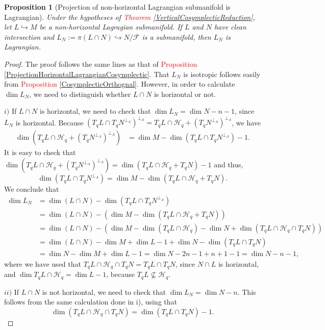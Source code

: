 \documentclass[12pt]{article}
\newtheorem{prop}{Proposition}[section]
\renewcommand{\dim}{\operatorname{dim}}
\begin{document}
\begin{prop}[Projection of non-horizontal Lagrangian submanifold is Lagrangian] \label{ProjectionNonHorizontalLagrangian}  Under the hypotheses of \textcolor{red}{Theorem \ref{VerticalCosymplecticReduction}}, let $L \hookrightarrow M$ be a non-horizontal Lagragian submanifold. If $L$ and $N$ have clean intersection and $L_N:= \pi(L \cap N) \hookrightarrow N/\mathcal{F}$ is a submanifold, then $L_N$ is Lagrangian.
\end{prop}
\begin{proof} The proof follows the same lines as that of \textcolor{red}{Proposition \ref{ProjectionHorizontalLagrangianCosymplectic}}. That $L_N$ is isotropic follows easily from \textcolor{red}{Proposition \ref{CosymplecticOrthognal}}. However, in order to calculate $\dim L_N$, we need to distinguish whether $L \cap N$ is horizontal or not. 
\item[$i)$] If $L\cap N$ is horizontal, we need to check that $\dim L_N = \dim N - n - 1$, since $L_N$ is horizontal. Because $(T_qL \cap T_qN^{\perp_\Lambda})^{\perp_\Lambda} = T_qL \cap \mathcal{H}_q + (T_qN^{\perp_\Lambda})^{\perp_\Lambda}$, we have
\begin{align*}
 \dim(T_qL\cap \mathcal{H}_q + (T_qN^{\perp_\Lambda})^{\perp_\Lambda}) &= \dim M - \dim (T_qL \cap T_qN^{\perp_\Lambda}) - 1.
\end{align*}
It is easy to check that $\dim(T_qL\cap \mathcal{H}_q + (T_qN^{\perp_\Lambda})^{\perp_\Lambda}) = \dim(T_qL\cap \mathcal{H}_q + T_qN) - 1$ and thus, $$\dim(T_qL \cap T_qN^{\perp_\Lambda}) = \dim M - \dim (T_qL\cap \mathcal{H}_q + T_qN).$$ We conclude that 
\begin{align*}
\dim L_N &= \dim(L \cap N) - \dim (T_qL \cap T_qN^{\perp_\Lambda})\\
& = \dim (L \cap N) - \left(\dim M - \dim(T_qL \cap \mathcal{H}_q  +T_qN) \right) \\
&=  \dim(L \cap N) - \left(\dim M - \dim(T_qL \cap \mathcal{H}_q) - \dim N+ \dim(T_qL \cap \mathcal{H}_q \cap T_qN)\right)\\
&= \dim(L \cap N) - \dim M + \dim L - 1 + \dim N -  \dim(T_qL \cap T_qN)\\
&= \dim N - \dim M + \dim L - 1 = \dim N - 2n - 1 + n + 1 - 1 = \dim N - n -1,
\end{align*}
where we have used that $T_qL \cap \mathcal{H}_q \cap T_qN = T_qL \cap T_qN$, since $N \cap L$ is horizontal, and $\dim T_qL \cap \mathcal{H} _q= \dim L  - 1$, because $T_qL \not \subseteq \mathcal{H}_q$.

\item[$ii)$] If $L\cap N$ is not horizontal, we need to check that $\dim L_N = \dim N - n$. This follows from the same calculation done in i), using that $$\dim(T_qL \cap \mathcal{H}_q \cap T_qN) = \dim(T_qL \cap T_qN) -1.$$
\end{proof}
\end{document}
